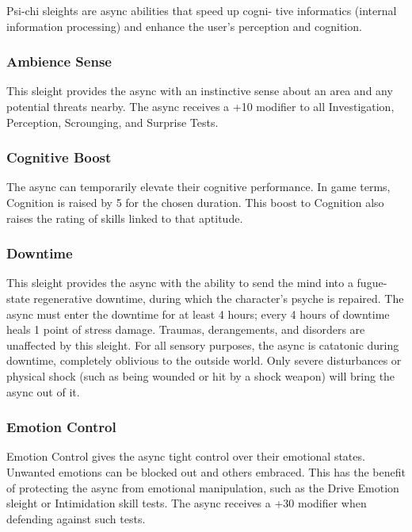 Psi-chi sleights are async abilities that speed up cogni-
tive informatics (internal information processing) and 
enhance the user's perception and cognition.

\subsubsection{Ambience Sense}

This sleight provides the async with an instinctive 
sense about an area and any potential threats nearby. 
The async receives a +10 modifier to all Investigation, 
Perception, Scrounging, and Surprise Tests.

\subsubsection{Cognitive Boost}

The async can temporarily elevate their cognitive 
performance. In game terms, Cognition is raised by 5 
for the chosen duration. This boost to Cognition also 
raises the rating of skills linked to that aptitude.

\subsubsection{Downtime}

This sleight provides the async with the ability 
to send the mind into a fugue-state regenerative 
downtime, during which the character's psyche is 
repaired. The async must enter the downtime for 
at least 4 hours; every 4 hours of downtime heals 
1 point of stress damage. Traumas, derangements, 
and disorders are unaffected by this sleight. For 
all sensory purposes, the async is catatonic during 
downtime, completely oblivious to the outside 
world. Only severe disturbances or physical shock 
(such as being wounded or hit by a shock weapon) 
will bring the async out of it.

\subsubsection{Emotion Control}

Emotion Control gives the async tight control 
over their emotional states. Unwanted emotions 
can be blocked out and others embraced. This has 
the benefit of protecting the async from emotional 
manipulation, such as the Drive Emotion sleight or 
Intimidation skill tests. The async receives a +30 
modifier when defending against such tests.

